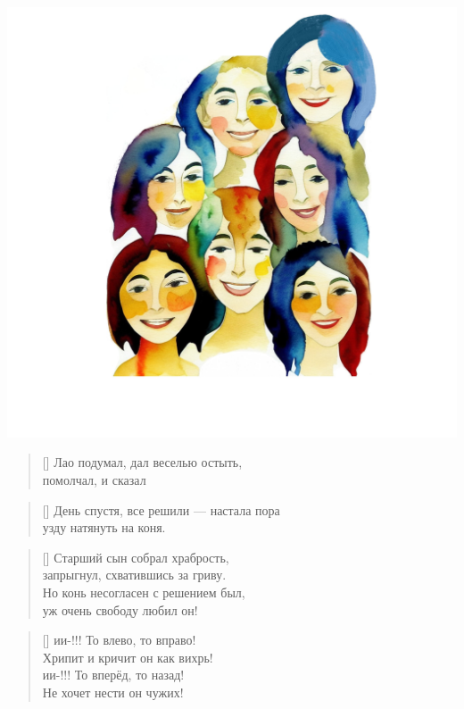 \documentclass[a5paper,11pt]{memoir}
\newcommand{\say}[1]{\emph{\textquote{#1}}}
\begin{document}
\hspace{-1cm}\includegraphics[width=14cm]{images/happy-faces}


\begin{verse}[\versewidth]
Лао подумал, дал веселью остыть, \\
помолчал, и сказал \say{может быть\ldots} \\
\end{verse}


\newpage
\begin{verse}[\versewidth]
День спустя, все решили --- настала пора \\
узду натянуть на коня. \\
\end{verse}

\begin{verse}[\versewidth]
Старший сын собрал храбрость, \\
запрыгнул, схватившись за гриву. \\
Но конь несогласен с решением был, \\
уж очень свободу любил он! \\
\end{verse}

\begin{verse}[\versewidth]
ии{}{}-{!!!} То влево, то вправо! \\
Хрипит и кричит он как вихрь! \\
ии{}{}-{!!!} То вперёд, то назад! \\
Не хочет нести он чужих! \\
\end{verse}
\end{document}
